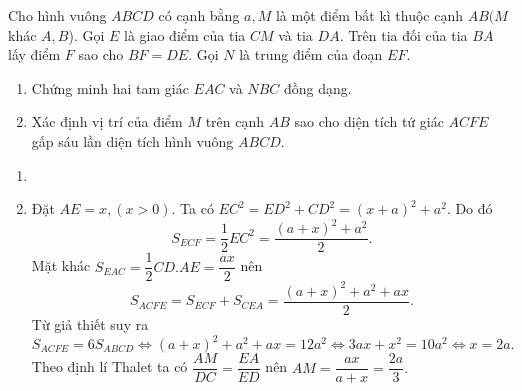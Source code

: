 \begin{ex}%
Cho hình vuông $ABCD$ có cạnh bằng $a, M$ là một điểm bất kì thuộc cạnh $AB (M$ khác $A,B$). Gọi $E$ là giao điểm của tia $CM$ và tia $DA$. Trên tia đối của tia $BA$ lấy điểm $F$ sao cho $BF=DE$. Gọi $N$ là trung điểm của đoạn $EF$. 
   \begin{enumerate}
        \item Chứng minh hai tam giác $EAC$ và $NBC$ đồng dạng.
        \item Xác định vị trí của điểm $M$ trên cạnh $AB$ sao cho diện tích tứ giác $ACFE$ gấp sáu lần diện tích hình vuông $ABCD$.
    \end{enumerate}
\loigiai
    {\begin{enumerate}
    \item {}
	
    \item Đặt $AE=x,(x>0)$. Ta có $EC^2=ED^2+CD^2=(x+a)^2+a^2$. Do đó 
    $$S_{ECF}=\dfrac{1}{2}EC^2=\dfrac{(a+x)^2+a^2}{2}.$$
    Mặt khác $S_{EAC}=\dfrac{1}{2}CD.AE=\dfrac{ax}{2}$ nên 
    $$S_{ACFE}=S_{ECF}+S_{CEA}=\dfrac{(a+x)^2+a^2+ax}{2}.$$
    Từ giả thiết suy ra
    $$S_{ACFE}=6S_{ABCD}\Leftrightarrow (a+x)^2+a^2+ax=12a^2\Leftrightarrow 3ax+x^2=10a^2\Leftrightarrow x=2a.$$
    Theo định lí Thalet ta có $\dfrac{AM}{DC}=\dfrac{EA}{ED}$ nên $AM=\dfrac{ax}{a+x}=\dfrac{2a}{3}.$
     \end{enumerate}
     }
\end{ex}

